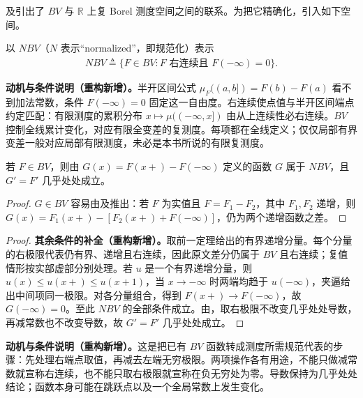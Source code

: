 \documentclass[../../main.tex]{subfiles}%
\begin{document}
及引出了 $BV$ 与 $\mathbb R$ 上复 Borel 测度空间之间的联系。为把它精确化，引入如下空间。
\begin{definition}[规范化有界变差函数]\label{definition:ch03-nbv-definition}
以 $NBV$（$N$ 表示“normalized”，即规范化）表示
\begin{align*}
NBV\triangleq\{F\in BV:F\text{ 右连续且 }F(-\infty)=0\}.
\end{align*}
\end{definition}
\begin{remark}
\textbf{动机与条件说明（重构新增）。}半开区间公式 $\mu_F((a,b])=F(b)-F(a)$ 看不到加法常数，条件 $F(-\infty)=0$ 固定这一自由度。右连续使点值与半开区间端点约定匹配：有限测度的累积分布 $x\mapsto\mu(( -\infty,x])$ 由从上连续性必右连续。$BV$ 控制全线累计变化，对应有限全变差的复测度。每项都在全线定义；仅仅局部有界变差一般对应局部有限测度，未必是本书所说的有限复测度。
\end{remark}

\begin{proposition}\label{proposition:ch03-nbv-normalization}
若 $F\in BV$，则由 $G(x)=F(x+)-F(-\infty)$ 定义的函数 $G$ 属于 $NBV$，且 $G'=F'$ 几乎处处成立。
\end{proposition}
\begin{proof}
$G\in BV$ 容易由及推出：若 $F$ 为实值且 $F=F_1-F_2$，其中 $F_1,F_2$ 递增，则 $G(x)=F_1(x+)-[F_2(x+)+F(-\infty)]$，仍为两个递增函数之差。
\end{proof}
\begin{proof}
\textbf{其余条件的补全（重构新增）。}取前一定理给出的有界递增分量。每个分量的右极限代表仍有界、递增且右连续，因此原文差分仍属于 $BV$ 且右连续；复值情形按实部虚部分别处理。若 $u$ 是一个有界递增分量，则 $u(x)\le u(x+)\le u(x+1)$，当 $x\to-\infty$ 时两端均趋于 $u(-\infty)$，夹逼给出中间项同一极限。对各分量组合，得到 $F(x+)\to F(-\infty)$，故 $G(-\infty)=0$。至此 $NBV$ 的全部条件成立。由，取右极限不改变几乎处处导数，再减常数也不改变导数，故 $G'=F'$ 几乎处处成立。
\end{proof}
\begin{remark}
\textbf{动机与条件说明（重构新增）。}这是把已有 $BV$ 函数转成测度所需规范代表的步骤：先处理右端点取值，再减去左端无穷极限。两项操作各有用途，不能只做减常数就宣称右连续，也不能只取右极限就宣称在负无穷处为零。导数保持为几乎处处结论；函数本身可能在跳跃点以及一个全局常数上发生变化。
\end{remark}
\end{document}
